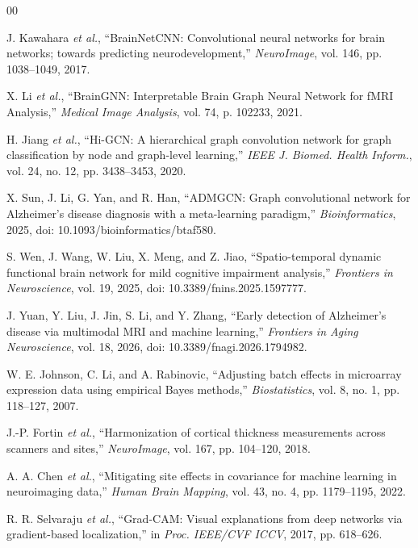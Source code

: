 \documentclass[conference]{IEEEtran}
\begin{document}
\begin{thebibliography}{00}

 J. Kawahara \textit{et al.}, ``BrainNetCNN: Convolutional neural networks for brain networks; towards predicting neurodevelopment,'' \textit{NeuroImage}, vol. 146, pp. 1038--1049, 2017.

 X. Li \textit{et al.}, ``BrainGNN: Interpretable Brain Graph Neural Network for fMRI Analysis,'' \textit{Medical Image Analysis}, vol. 74, p. 102233, 2021.

 H. Jiang \textit{et al.}, ``Hi-GCN: A hierarchical graph convolution network for graph classification by node and graph-level learning,'' \textit{IEEE J. Biomed. Health Inform.}, vol. 24, no. 12, pp. 3438--3453, 2020.

 X. Sun, J. Li, G. Yan, and R. Han, ``ADMGCN: Graph convolutional network for Alzheimer's disease diagnosis with a meta-learning paradigm,'' \textit{Bioinformatics}, 2025, doi: 10.1093/bioinformatics/btaf580.

 S. Wen, J. Wang, W. Liu, X. Meng, and Z. Jiao, ``Spatio-temporal dynamic functional brain network for mild cognitive impairment analysis,'' \textit{Frontiers in Neuroscience}, vol. 19, 2025, doi: 10.3389/fnins.2025.1597777.

 J. Yuan, Y. Liu, J. Jin, S. Li, and Y. Zhang, ``Early detection of Alzheimer's disease via multimodal MRI and machine learning,'' \textit{Frontiers in Aging Neuroscience}, vol. 18, 2026, doi: 10.3389/fnagi.2026.1794982.

 W. E. Johnson, C. Li, and A. Rabinovic, ``Adjusting batch effects in microarray expression data using empirical Bayes methods,'' \textit{Biostatistics}, vol. 8, no. 1, pp. 118--127, 2007.

 J.-P. Fortin \textit{et al.}, ``Harmonization of cortical thickness measurements across scanners and sites,'' \textit{NeuroImage}, vol. 167, pp. 104--120, 2018.

 A. A. Chen \textit{et al.}, ``Mitigating site effects in covariance for machine learning in neuroimaging data,'' \textit{Human Brain Mapping}, vol. 43, no. 4, pp. 1179--1195, 2022.

 R. R. Selvaraju \textit{et al.}, ``Grad-CAM: Visual explanations from deep networks via gradient-based localization,'' in \textit{Proc. IEEE/CVF ICCV}, 2017, pp. 618--626.


\end{thebibliography}
\end{document}
